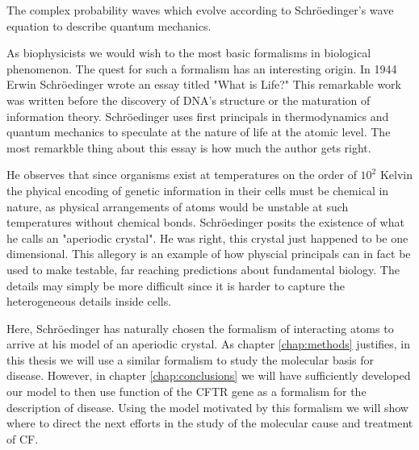 The complex probability waves which evolve according to Schr\"oedinger's wave equation to describe quantum mechanics. 

As biophysicists we would wish to the most basic formalisms in biological phenomenon. The quest for such a formalism has an interesting origin. In 1944 Erwin Schr\"oedinger wrote an essay titled "What is Life?" This remarkable work was written before the discovery of DNA's structure or the maturation of information theory. Schr\"oedinger uses first principals in thermodynamics and quantum mechanics to speculate at the nature of life at the atomic level. The most remarkble thing about this essay is how much the author gets right. 

He observes that since organisms exist at temperatures on the order of $10^2 $ Kelvin the phyical encoding of genetic information in their cells must be chemical in nature, as physical arrangements of atoms would be unstable at such temperatures without chemical bonds. Schr\"oedinger posits the existence of what he calls an "aperiodic crystal". He was right, this crystal just happened to be one dimensional. This allegory is an example of how physcial principals can in fact be used to make testable, far reaching predictions about fundamental biology. The details may simply be more difficult since it is harder to capture the heterogeneous details inside cells.

Here, Schr\"oedinger has naturally chosen the formalism of interacting atoms to arrive at his model of an aperiodic crystal. As chapter \ref{chap:methods} justifies, in this thesis we will use a similar formalism to study the molecular basis for disease. However, in chapter \ref{chap:conclusions} we will have sufficiently developed our model to then use function of the CFTR gene as a formalism for the description of disease. Using the model motivated by this formalism we will show where to direct the next efforts in the study of the molecular cause and treatment of CF.

 


